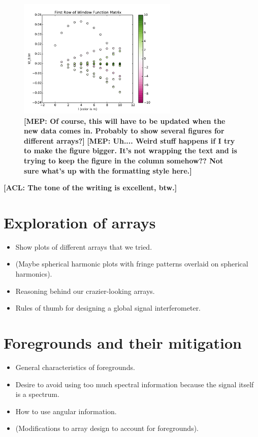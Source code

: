 \documentclass[twolcolumn,apj]{emulateapj}
\newcommand{\acl}[1]{{\color{red} \textbf{[ACL:  #1]}}}
\newcommand{\mep}[1]{{\color{applegreen} \textbf{[MEP:  #1]}}}
\begin{document}
\begin{figure}[h]
	\centering
	\includegraphics[width=3in]{figures/W_matrix_filler.pdf}
	\caption{\mep{Of course, this will have to be updated when the new data comes in. Probably to show several figures for different arrays?}\mep{Uh.... Weird stuff happens if I try to make the figure bigger. It's not wrapping the text and is trying to keep the figure in the column somehow?? Not sure what's up with the formatting style here.}}
	\label{fig:WindowFunction}
\end{figure}

\acl{The tone of the writing is excellent, btw.}

\section{Exploration of arrays}
\begin{itemize}
\item Show plots of different arrays that we tried.
\item (Maybe spherical harmonic plots with fringe patterns overlaid on spherical harmonics).
\item Reasoning behind our crazier-looking arrays.
\item Rules of thumb for designing a global signal interferometer.
\end{itemize}

\section{Foregrounds and their mitigation}
\begin{itemize}
\item General characteristics of foregrounds.
\item Desire to avoid using too much spectral information because the signal itself is a spectrum.
\item How to use angular information.
\item (Modifications to array design to account for foregrounds).
\end{itemize}
\end{document}
